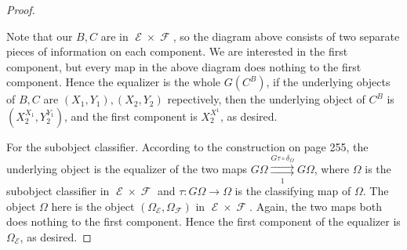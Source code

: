 \documentclass[a4paper]{article}
\DeclareMathOperator{\E}{\mathcal E}
\DeclareMathOperator{\F}{\mathcal F}
\begin{document}
\begin{proof}
    \begin{center}
    \end{center}

    Note that our $B,C$ are in $\E\times \F$, so the diagram above consists of two separate pieces of information on each component. We are interested in the first component, but every map in the above diagram does nothing to the first component. Hence the equalizer is the whole $G(C^B)$, if the underlying objects of $B,C$ are $(X_1,Y_1),(X_2,Y_2)$ repectively, then the underlying object of $C^B$ is $(X_2^{X_1},Y_2^{Y_1})$, and the first component is $X_2^{X^1}$, as desired.

    For the subobject classifier. According to the construction on page 255, the underlying object is the equalizer of the two maps $G\Omega\overset{G\tau\circ \delta_{\Omega}}{\underset{1}\rightrightarrows} G\Omega$, where $\Omega$ is the subobject classifier in $\E\times \F$ and $\tau:G\Omega\to \Omega$ is the classifying map of $\Omega$. The object $\Omega$ here is the object $(\Omega_{\E},\Omega_{\F})$ in $\E\times \F$. Again, the two maps both does nothing to the first component. Hence the first component of the equalizer is $\Omega_{\E}$, as desired.

\end{proof}
\end{document}
